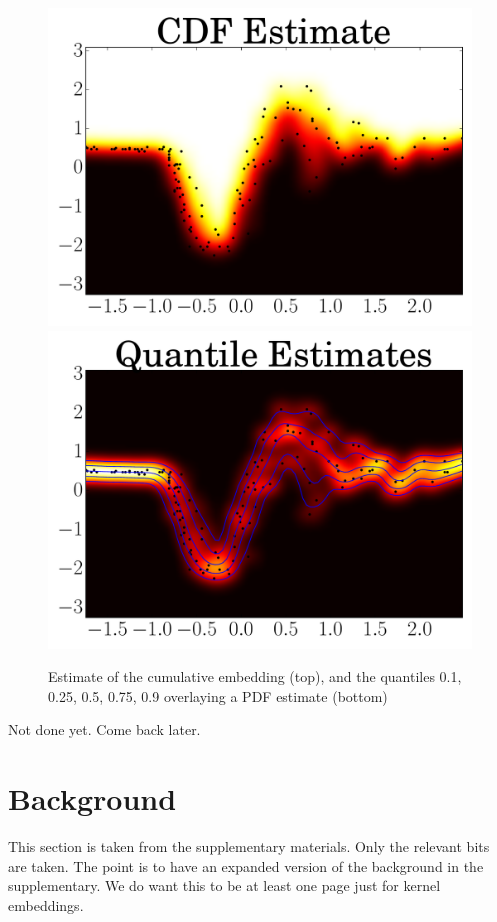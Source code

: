 \documentclass[twoside]{article} \usepackage{aistats2017}
\theoremstyle{definition}
\newcommand{\warn}[1]{{\color{red} #1}}
\begin{document}

	\begin{figure}
		\begin{center}
			\includegraphics[width=0.48\columnwidth]{figures/mcquantiles_1}
			\includegraphics[width=0.48\columnwidth]{figures/mcquantiles_2}
		\end{center}
		\caption{\small Estimate of the cumulative embedding (top),
			and the quantiles 0.1, 0.25, 0.5, 0.75, 0.9 overlaying a PDF estimate
			(bottom)}
		\label{fig:cembedding}
	\end{figure}
	
	\warn{Not done yet. Come back later.}
	
\section{Background}
\label{sec:background}
	
	\warn{This section is taken from the supplementary materials. Only the relevant bits are taken. The point is to have an expanded version of the background in the supplementary. We do want this to be at least one page just for kernel embeddings.}
	
\end{document}
